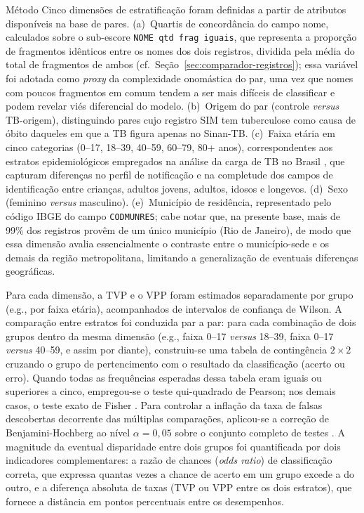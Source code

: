 \begin{chapter}{Método}
Cinco dimensões de estratificação foram definidas a partir de atributos disponíveis na base de pares. (a)~Quartis de concordância do campo nome, calculados sobre o sub-escore \texttt{NOME qtd frag iguais}, que representa a proporção de fragmentos idênticos entre os nomes dos dois registros, dividida pela média do total de fragmentos de ambos (cf.\ Seção~\ref{sec:comparador-registros}); essa variável foi adotada como \textit{proxy} da complexidade onomástica do par, uma vez que nomes com poucos fragmentos em comum tendem a ser mais difíceis de classificar e podem revelar viés diferencial do modelo. (b)~Origem do par (controle \textit{versus} TB-origem), distinguindo pares cujo registro SIM tem tuberculose como causa de óbito daqueles em que a TB figura apenas no Sinan-TB. (c)~Faixa etária em cinco categorias (0--17, 18--39, 40--59, 60--79, 80+ anos), correspondentes aos estratos epidemiológicos empregados na análise da carga de TB no Brasil \cite{Brasil2024tb}, que capturam diferenças no perfil de notificação e na completude dos campos de identificação entre crianças, adultos jovens, adultos, idosos e longevos. (d)~Sexo (feminino \textit{versus} masculino). (e)~Município de residência, representado pelo código IBGE do campo \texttt{CODMUNRES}; cabe notar que, na presente base, mais de 99\% dos registros provêm de um único município (Rio de Janeiro), de modo que essa dimensão avalia essencialmente o contraste entre o município-sede e os demais da região metropolitana, limitando a generalização de eventuais diferenças geográficas.

Para cada dimensão, a TVP e o VPP foram estimados separadamente por grupo (e.g., por faixa etária), acompanhados de intervalos de confiança de Wilson. A comparação entre estratos foi conduzida par a par: para cada combinação de dois grupos dentro da mesma dimensão (e.g., faixa 0--17 \textit{versus} 18--39, faixa 0--17 \textit{versus} 40--59, e assim por diante), construiu-se uma tabela de contingência $2 \times 2$ cruzando o grupo de pertencimento com o resultado da classificação (acerto ou erro). Quando todas as frequências esperadas dessa tabela eram iguais ou superiores a cinco, empregou-se o teste qui-quadrado de Pearson; nos demais casos, o teste exato de Fisher \cite{Agresti2007}. Para controlar a inflação da taxa de falsas descobertas decorrente das múltiplas comparações, aplicou-se a correção de Benjamini-Hochberg ao nível $\alpha = 0{,}05$ sobre o conjunto completo de testes \cite{Benjamini1995fdr}. A magnitude da eventual disparidade entre dois grupos foi quantificada por dois indicadores complementares: a razão de chances (\textit{odds ratio}) de classificação correta, que expressa quantas vezes a chance de acerto em um grupo excede a do outro, e a diferença absoluta de taxas (TVP ou VPP entre os dois estratos), que fornece a distância em pontos percentuais entre os desempenhos.


\end{chapter}
